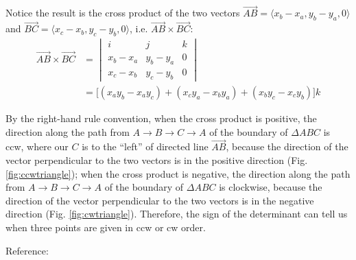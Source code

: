 \documentclass [12pt]{article}
\begin{document}
\begin{enumerate}[label=(\alph*)]

            Notice the result is the cross product of the two vectors $\overrightarrow{AB} = \langle x_b - x_a, y_b - y_a, 0 \rangle$ and $\overrightarrow{BC} = \langle x_c - x_b, y_c - y_b, 0 \rangle$, i.e. $\overrightarrow{AB} \times \overrightarrow{BC}$:
            \begin{align*}
                \overrightarrow{AB} \times \overrightarrow{BC} &= 
                \begin{vmatrix}
                    i & j & k \\
                    x_b - x_a & y_b - y_a & 0 \\ 
                    x_c - x_b & y_c - y_b & 0
                \end{vmatrix} \\
                &= \big[(x_a y_b - x_a y_c) + (x_c y_a - x_b y_a) + (x_b y_c - x_c y_b)\big] k
            \end{align*}

            By the right-hand rule convention, when the cross product is positive, the direction along the path from $A \rightarrow B \rightarrow C \rightarrow A$ of the boundary of $\Delta ABC$ is ccw, where our $C$ is to the ``left'' of directed line $\overrightarrow{AB}$, because the direction of the vector perpendicular to the two vectors is in the positive direction (Fig. \ref{fig:ccwtriangle}); when the cross product is negative, the direction along the path from $A \rightarrow B \rightarrow C \rightarrow A$ of the boundary of $\Delta ABC$ is clockwise, because the direction of the vector perpendicular to the two vectors is in the negative direction (Fig. \ref{fig:cwtriangle}). Therefore, the sign of the determinant can tell us when three points are given in ccw or cw order.

            Reference: \cite{crossprod2vec} \cite{mathcurvorien}


\end{enumerate}
\end{document}
